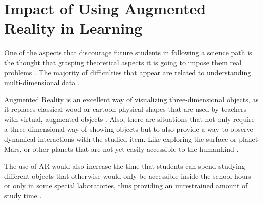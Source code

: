 \documentclass[12 pct]{report}
\begin{document}
\section{Impact of Using Augmented Reality in Learning}
One of the aspects that discourage future students in following a science path is the thought that grasping theoretical aspects it is going to impose them real problems \cite{baker2009educational}. 
The majority of difficulties that appear are related to understanding multi-dimensional data \cite{pao1998visualization}.

Augmented Reality is an excellent way of visualizing three-dimensional objects, as it replaces classical wood or cartoon physical shapes that are used by teachers with virtual, augmented objects \cite{schmalstieg2007managing}. 
Also, there are situations that not only require a three dimensional way of showing objects but to also provide a way to observe dynamical interactions with the studied item.
Like exploring the surface or planet Mars, or other planets that are not yet easily accessible to the humankind \cite{hollerer1999exploring}.

The use of AR would also increase the time that students can spend studying different objects that otherwise would only be accessible inside the school hours or only in some special laboratories, thus providing an unrestrained amount of study time \cite{yoon2014making}.
\end{document}
